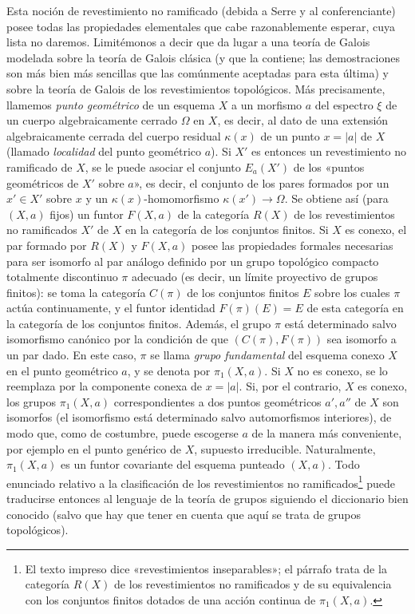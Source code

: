 Esta noción de revestimiento no ramificado (debida a Serre y al conferenciante)
posee todas las propiedades elementales que cabe razonablemente esperar, cuya
lista no daremos. Limitémonos a decir que da lugar a una teoría de Galois
modelada sobre la teoría de Galois clásica (y que la contiene; las
demostraciones son más bien más sencillas que las comúnmente aceptadas para
esta última) y sobre la teoría de Galois de los revestimientos topológicos. Más
precisamente, llamemos \emph{punto geométrico} de un esquema $X$ a un morfismo
$a$ del espectro $\xi$ de un cuerpo algebraicamente cerrado $\Omega$ en $X$, es
decir, al dato de una extensión algebraicamente cerrada del cuerpo residual
$\kappa(x)$ de un punto $x=|a|$ de $X$ (llamado \emph{localidad} del punto
geométrico $a$). Si $X'$ es entonces un revestimiento no ramificado de $X$, se
le puede asociar el conjunto $E_a(X')$ de los «puntos geométricos de $X'$ sobre
$a$», es decir, el conjunto de los pares formados por un $x'\in X'$ sobre $x$
y un $\kappa(x)$-homomorfismo $\kappa(x')\longrightarrow\Omega$. Se obtiene así
(para $(X,a)$ fijos) un funtor $F(X,a)$ de la categoría $R(X)$ de los
revestimientos no ramificados $X'$ de $X$ en la categoría de los conjuntos
finitos. Si $X$ es conexo, el par formado por $R(X)$ y $F(X,a)$ posee las
propiedades formales necesarias para ser isomorfo al par análogo definido por
un grupo topológico compacto totalmente discontinuo $\pi$ adecuado (es decir,
un límite proyectivo de grupos finitos): se toma la categoría $C(\pi)$ de los
conjuntos finitos $E$ sobre los cuales $\pi$ actúa continuamente, y el funtor
identidad $F(\pi)(E)=E$ de esta categoría en la categoría de los conjuntos
finitos. Además, el grupo $\pi$ está determinado salvo isomorfismo canónico por
la condición de que $(C(\pi),F(\pi))$ sea isomorfo a un par dado. En este caso,
$\pi$ se llama \emph{grupo fundamental} del esquema conexo $X$ en el punto
geométrico $a$, y se denota por $\pi_1(X,a)$. Si $X$ no es conexo, se lo
reemplaza por la componente conexa de $x=|a|$. Si, por el contrario, $X$ es
conexo, los grupos $\pi_1(X,a)$ correspondientes a dos puntos geométricos
$a',a''$ de $X$ son isomorfos (el isomorfismo está determinado salvo
automorfismos interiores), de modo que, como de costumbre, puede escogerse $a$
de la manera más conveniente, por ejemplo en el punto genérico de $X$, supuesto
irreducible. Naturalmente, $\pi_1(X,a)$ es un funtor covariante del esquema
punteado $(X,a)$. Todo enunciado relativo a la clasificación de los
revestimientos no ramificados\footnote{El texto impreso dice «revestimientos
inseparables»; el párrafo trata de la categoría $R(X)$ de los revestimientos no
ramificados y de su equivalencia con los conjuntos finitos dotados de una acción
continua de $\pi_1(X,a)$.} puede traducirse entonces al lenguaje de la teoría de
grupos siguiendo el diccionario bien conocido (salvo que hay que tener en cuenta
que aquí se trata de grupos topológicos).

